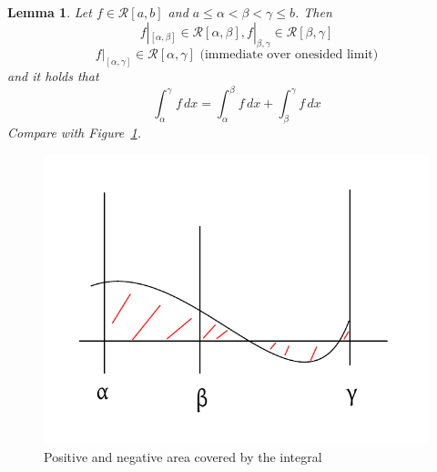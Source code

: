 \documentclass{article}
\newtheorem{lemma}{Lemma}  \numberwithin{lemma}{section}
\begin{document}
\begin{lemma} %
  Let $f \in \mathcal R[a,b]$ and $a \leq \alpha < \beta < \gamma \leq b$.
  Then
  \[ f|_{[\alpha,\beta]} \in \mathcal R[\alpha,\beta], f|_{\beta,\gamma} \in \mathcal R[\beta,\gamma] \]
  \[ f|_{[\alpha,\gamma]} \in \mathcal R[\alpha,\gamma] \text{ (immediate over onesided limit)} \]
  and it holds that
  \[ \int_{\alpha}^\gamma f\, dx = \int_{\alpha}^\beta f \, dx + \int_\beta^\gamma f \, dx \]
  Compare with Figure~\ref{img:posneg}.
\end{lemma}

\begin{figure}
  \begin{center}
    \includegraphics{img/17_posneg_area.pdf}
    \caption{Positive and negative area covered by the integral}
    \label{img:posneg}
  \end{center}
\end{figure}
\end{document}
